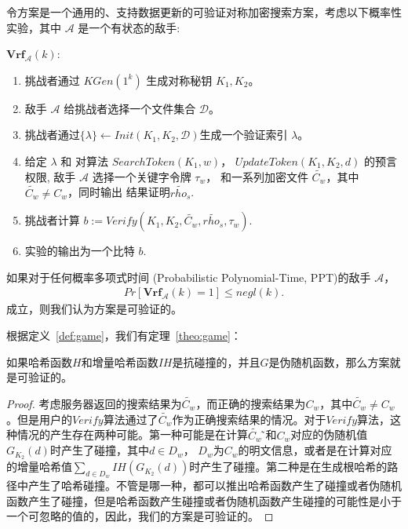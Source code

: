 \begin{definition}\label{def:game}
  \itshape{
      令方案\single 是一个通用的、支持数据更新的可验证对称加密搜索方案，考虑以下概率性实验，其中 $\mathcal{A}$ 是一个有状态的敌手:

      \noindent$\mathbf{Vrf}_\mathcal{A}(k)$:
      \begin{enumerate}[1.]
        \item 挑战者通过 $KGen(1^k)$ 生成对称秘钥 $K_1,K_2$。
        \item 敌手 $\mathcal{A}$ 给挑战者选择一个文件集合 $\mathcal{D}$。
        \item 挑战者通过$\{\lambda\} \leftarrow Init(K_1,K_2,\mathcal{D})$生成一个验证索引 $\lambda$。
        \item 给定 $\lambda$ 和 对算法 $SearchToken(K_1,w)$， $UpdateToken(K_1,K_2,d)$ 的预言权限, 敌手 $\mathcal{A}$ 选择一个关键字令牌 $\tau_w$， 和一系列加密文件 $\tilde{C_w}$，其中 $\tilde{C_w} \neq C_w$，同时输出%
        结果证明$\tilde{rho_s}$.
        \item 挑战者计算 $b:=Verify(K_1,K_2,\tilde{C_w},\tilde{rho_s},\tau_w)$.
        \item 实验的输出为一个比特 $b$.
      \end{enumerate}
      如果对于任何概率多项式时间 (Probabilistic Polynomial-Time, PPT)的敌手 $\mathcal{A}$，
      \begin{align}\label{equ:game}
        Pr[\mathbf{Vrf}_\mathcal{A}(k)=1] \leq negl(k).
      \end{align}
      成立，则我们认为\single 方案是可验证的。
  }
\end{definition}

根据定义~\ref{def:game}，我们有定理~\ref{theo:game}：
\begin{theorem}\label{theo:game}
    如果哈希函数$H$和增量哈希函数$IH$是抗碰撞的，并且$G$是伪随机函数，那么\single 方案就是可验证的。
\end{theorem}

\begin{proof}
  考虑服务器返回的搜索结果为$\tilde{C_w}$，而正确的搜索结果为$C_w$，其中$\tilde{C_w} \neq C_w$。但是用户的$Verify$算法通过了$\tilde{C_w}$作为正确搜索结果的情况。对于$Verify$算法，这种情况的产生存在两种可能。第一种可能是在计算$\tilde{C_w}$ ̃和$C_w$对应的伪随机值$G_{K_2}(d)$时产生了碰撞，其中$d \in D_w$， $D_w$为$C_w$的明文信息，或者是在计算对应的增量哈希值$\sum_{d \in D_{w}}IH (G_{K_2} (d))$时产生了碰撞。第二种是在生成根哈希的路径中产生了哈希碰撞。不管是哪一种，都可以推出哈希函数产生了碰撞或者伪随机函数产生了碰撞，但是哈希函数产生碰撞或者伪随机函数产生碰撞的可能性是小于一个可忽略的值的，因此，我们的方案是可验证的。
\end{proof}


